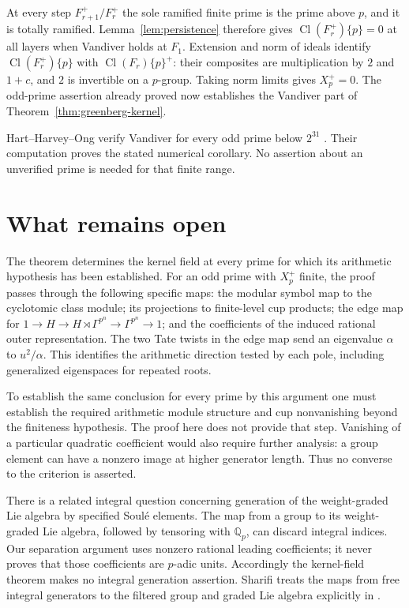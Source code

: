\documentclass[11pt]{article}
\theoremstyle{definition}
\numberwithin{equation}{section}
\begin{document}
At every step $F_{r+1}^+/F_r^+$ the sole ramified finite prime is the
prime above $p$, and it is totally ramified. Lemma~\ref{lem:persistence}
therefore gives $\operatorname{Cl}(F_r^+)\{p\}=0$ at all layers when
Vandiver holds at $F_1$. Extension and norm of ideals identify
$\operatorname{Cl}(F_r^+)\{p\}$ with
$\operatorname{Cl}(F_r)\{p\}^+$: their composites are multiplication
by $2$ and $1+c$, and $2$ is invertible on a $p$-group. Taking norm
limits gives $X_p^+=0$. The odd-prime assertion already proved now
establishes the Vandiver part of Theorem~\ref{thm:greenberg-kernel}.

Hart--Harvey--Ong verify Vandiver for every odd prime below $2^{31}$
\cite[Section 1, item (2)]{HartHarveyOng2017}. Their computation
proves the stated numerical
corollary. No assertion about an unverified prime is needed for that
finite range.


\section{What remains open}

The theorem determines the kernel field at every prime for which its
arithmetic hypothesis has been established. For an odd prime with
$X_p^+$ finite, the proof passes through the following specific maps:
the modular symbol map to the cyclotomic class module; its projections
to finite-level cup products; the edge map for
$1\to H\to H\rtimes\Gamma^{p^n}\to\Gamma^{p^n}\to1$;
and the coefficients of the induced rational outer representation.
The two Tate twists in the edge map send an eigenvalue $\alpha$ to
$u^2/\alpha$. This identifies the arithmetic direction tested by each
pole, including generalized eigenspaces for repeated roots.

To establish the same conclusion for every prime by this argument one
must establish the required arithmetic module structure and cup
nonvanishing beyond the finiteness hypothesis. The proof here does not
provide that step. Vanishing of a particular quadratic coefficient
would also require further analysis: a group element can have a
nonzero image at higher generator length. Thus no converse to the
criterion is asserted.

There is a related integral question concerning generation of the
weight-graded Lie algebra by specified Soul\'e elements. The map from
a group to its weight-graded Lie algebra, followed by tensoring with
$\mathbb Q_p$, can discard integral indices. Our separation argument
uses nonzero rational leading coefficients; it never proves that those
coefficients are $p$-adic units. Accordingly the kernel-field theorem
makes no integral generation assertion. Sharifi treats the maps from
free integral generators to the filtered group and graded Lie algebra
explicitly in \cite[Sections 1 and 4]{Sharifi2002}.
\end{document}
